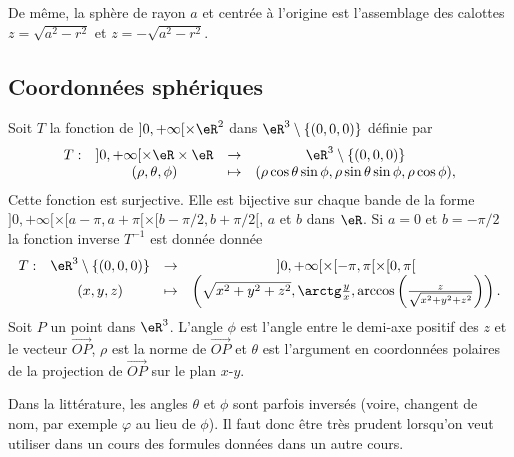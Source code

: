 \begin{example}
 De même,  la sphère de rayon $a$ et centrée à l'origine est l'assemblage des calottes $z=\sqrt{a^2-r^2}$ et $z=-\sqrt{a^2-r^2}$. 
\end{example}

\subsection{Coordonnées sphériques}

Soit $T$ la fonction de $]0, +\infty[\times \eR^2$ dans $\eR^3\setminus\{(0,0,0)\}$ définie par
\begin{equation}
  \begin{array}{lccc}
    T: &]0, +\infty[\times \eR\times \eR & \to & \eR^3\setminus\{(0,0,0)\}\\
 & (\rho, \theta, \phi)&\mapsto& (\rho\cos \theta\sin \phi, \rho \sin \theta\sin \phi, \rho\cos \phi),
  \end{array}
\end{equation}
Cette fonction est surjective. Elle est bijective sur chaque bande de la forme  $]0, +\infty[\times [a-\pi,a+\pi[\times [b-\pi/2, b+\pi/2[$, $a$ et $b$ dans $\eR$.  Si $a =0$ et $b=-\pi/2$ la fonction inverse $T^{-1}$ est donnée donnée
\begin{equation}
  \begin{array}{lccc}
    T: &\eR^3\setminus\{(0,0,0)\} & \to & ]0, +\infty[\times [-\pi,\pi[\times [0, \pi[\\
 & (x,y,z)&\mapsto& \left(\sqrt{x^2+y^2+z^2}, \arctg \frac{y}{x}, \arccos \left(\frac{z}{\sqrt{x^2+y^2+z^2}}\right)\right). 
  \end{array}
\end{equation}
Soit $ P$ un point dans $\eR^3$. L'angle $\phi$ est l'angle entre le demi-axe positif des $z$ et le vecteur $\overrightarrow{OP}$, $\rho$ est la norme de $\overrightarrow{OP}$ et $\theta$ est l'argument en coordonnées polaires de la projection de $\overrightarrow{OP}$ sur le plan $x$-$y$.  

\begin{remark}
	Dans la littérature, les angles $\theta$ et $\phi$ sont parfois inversés (voire, changent de nom, par exemple $\varphi$ au lieu de $\phi$). Il faut donc être très prudent lorsqu'on veut utiliser dans un cours des formules données dans un autre cours.
\end{remark}

